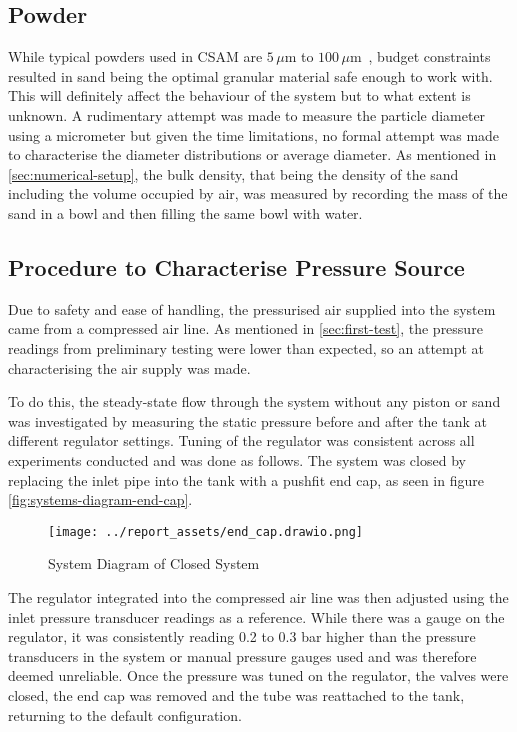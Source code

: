 \subsection{Powder}
While typical powders used in CSAM are $5\,\mu\mathrm{m}$ to $100\,\mu\mathrm{m}$~\cite{Vaz2023}, budget constraints resulted in sand being the optimal granular material safe enough to work with. This will definitely affect the behaviour of the system but to what extent is unknown. A rudimentary attempt was made to measure the particle diameter using a micrometer but given the time limitations, no formal attempt was made to characterise the diameter distributions or average diameter. As mentioned in \autoref{sec:numerical-setup}, the bulk density, that being the density of the sand including the volume occupied by air, was measured by recording the mass of the sand in a bowl and then filling the same bowl with water.



\subsection{Procedure to Characterise Pressure Source}\label{sec:pressure-source-procedure}
Due to safety and ease of handling, the pressurised air supplied into the system came from a compressed air line. As mentioned in \autoref{sec:first-test}, the pressure readings from preliminary testing were lower than expected, so an attempt at characterising the air supply was made. 

To do this, the steady-state flow through the system without any piston or sand was investigated by measuring the static pressure before and after the tank at different regulator settings. Tuning of the regulator was consistent across all experiments conducted and was done as follows. The system was closed by replacing the inlet pipe into the tank with a pushfit end cap, as seen in figure \autoref{fig:systems-diagram-end-cap}.
\begin{figure}[htbp]
    \centering
    \begin{minipage}{0.60\textwidth}
        \centering
        \texttt{[image: ../report\_assets/end\_cap.drawio.png]}
        \caption{System Diagram of Closed System}\label{fig:systems-diagram-end-cap}
    \end{minipage}
\end{figure}
The regulator integrated into the compressed air line was then adjusted using the inlet pressure transducer readings as a reference. While there was a gauge on the regulator, it was consistently reading 0.2 to 0.3 bar higher than the pressure transducers in the system or manual pressure gauges used and was therefore deemed unreliable. Once the pressure was tuned on the regulator, the valves were closed, the end cap was removed and the tube was reattached to the tank, returning to the default configuration. 

